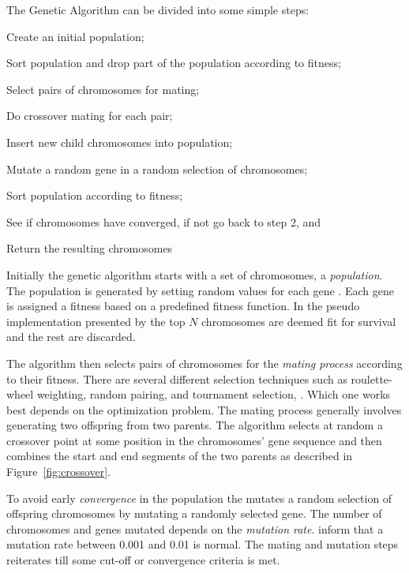 The Genetic Algorithm can be divided into some simple steps:
\begin{inparaenum}[\itshape 1\upshape)]
\item Create an initial population;
\item Sort population and drop part of the population according to fitness;
\item Select pairs of chromosomes for mating;
\item Do crossover mating for each pair;
\item Insert new child chromosomes into population;
\item Mutate a random gene in a random selection of chromosomes;
\item Sort population according to fitness;
\item See if chromosomes have converged, if not go back to step 2, and
\item Return the resulting chromosomes
\end{inparaenum}

Initially the genetic algorithm starts with a set of chromosomes, a \textit{population}. The population is generated by setting random values for each gene \cite{Haupt2004a,Negnevitsky2002,Goldberg1989}. Each gene is assigned a fitness based on a predefined fitness function. In the pseudo implementation presented by \citeauthor{Haupt2004a} the top \(N\) chromosomes are deemed fit for survival and the rest are discarded.

The algorithm then selects pairs of chromosomes for the \textit{mating process} according to their fitness. There are several different selection techniques such as roulette-wheel weighting, random pairing, and tournament selection, \cite{Haupt2004a}. Which one works best depends on the optimization problem. The mating process generally involves generating two offspring from two parents. The algorithm selects at random a crossover point at some position in the chromosomes' gene sequence and then combines the start and end segments of the two parents as described in Figure~\ref{fig:crossover}.

To avoid early \textit{convergence} in the population the \GA mutates a random selection of offspring chromosomes by mutating a randomly selected gene. The number of chromosomes and genes mutated depends on the \textit{mutation rate}. \cite{Goldberg1989,Negnevitsky2002} inform that a mutation rate between 0.001 and 0.01 is normal. The mating and mutation steps reiterates till some cut-off or convergence criteria is met.

